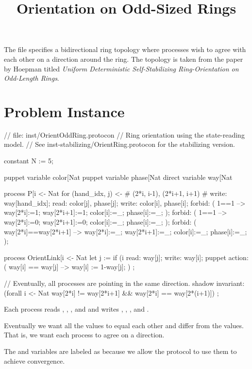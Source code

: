 
\title{Orientation on Odd-Sized Rings}
\date{}



The  file specifies a bidirectional ring topology where processes wish to agree with each other on a direction around the ring.
The topology is taken from the paper by Hoepman titled \textit{Uniform Deterministic Self-Stabilizing Ring-Orientation on Odd-Length Rings}.

\section{Problem Instance}
\begin{code}
// file: inst/OrientOddRing.protocon
// Ring orientation using the state-reading model.
// See inst-stabilizing/OrientRing.protocon for the stabilizing version.

constant N := 5;

puppet variable color[Nat %
puppet variable phase[Nat %
direct variable way[Nat %

process P[i <- Nat %
{
  for (hand_idx, j)  <- {# (2*i, i-1), (2*i+1, i+1) #}
  {
    write: way[hand_idx];
    read: color[j], phase[j];
  }
  write: color[i], phase[i];
  forbid: ( 1==1 --> way[2*i]:=1; way[2*i+1]:=1; color[i]:=_; phase[i]:=_; );
  forbid: ( 1==1 --> way[2*i]:=0; way[2*i+1]:=0; color[i]:=_; phase[i]:=_; );
  forbid: ( way[2*i]==way[2*i+1] --> way[2*i]:=_; way[2*i+1]:=_; color[i]:=_; phase[i]:=_; );
}

process OrientLink[i <- Nat %
{
  let j := if (i %
  read: way[j];
  write: way[i];
  puppet action:
    ( way[i] == way[j] --> way[i] := 1-way[j]; )
    ;
}

// Eventually, all processes are pointing in the same direction.
shadow invariant:
  (forall i <- Nat %
   way[2*i] != way[2*i+1]
   &&
   way[2*i] == way[2*(i+1)])
  ;
\end{code}

Each process  reads , , , and  and writes , , , and .

Eventually we want all the  values to equal each other and differ from the  values.
That is, we want each process to agree on a direction.

The  and  variables are labeled as  because we allow the protocol to use them to achieve convergence.

